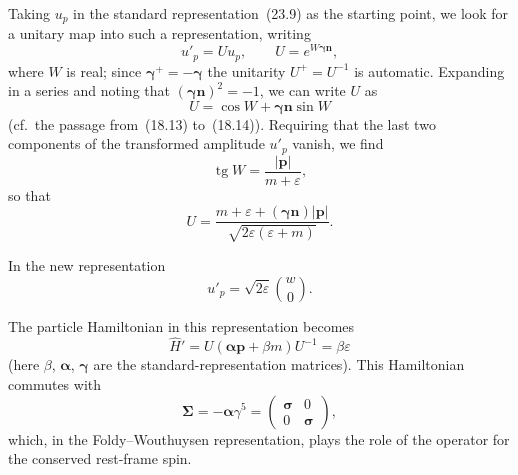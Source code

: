 Taking $u_p$ in the standard representation~(23.9) as the starting point, we look for a unitary map into such a representation, writing
\[
u'_p = Uu_p,\qquad U = e^{W\boldsymbol{\gamma}\mathbf{n}},
\]
where $W$ is real; since $\boldsymbol{\gamma}^+ = -\boldsymbol{\gamma}$ the unitarity $U^+ = U^{-1}$ is automatic. Expanding in a series and noting that $(\boldsymbol{\gamma}\mathbf{n})^2 = -1$, we can write $U$ as
\[
U = \cos W + \boldsymbol{\gamma}\mathbf{n}\sin W
\]
(cf.\ the passage from~(18.13) to~(18.14)). Requiring that the last two components of the transformed amplitude $u'_p$ vanish, we find
\[
\operatorname{tg} W = \frac{|\mathbf{p}|}{m + \varepsilon},
\]
so that
\[
U = \frac{m + \varepsilon + (\boldsymbol{\gamma}\mathbf{n})|\mathbf{p}|}{\sqrt{2\varepsilon(\varepsilon + m)}}.
\]

In the new representation
\begin{equation}
u'_p = \sqrt{2\varepsilon}\binom{w}{0}.
\tag{23.17}
\end{equation}

The particle Hamiltonian in this representation becomes
\begin{equation}
\widehat H' = U(\boldsymbol{\alpha}\mathbf{p} + \beta m)U^{-1} = \beta\varepsilon
\tag{23.18}
\end{equation}
(here $\beta$, $\boldsymbol{\alpha}$, $\boldsymbol{\gamma}$ are the standard-representation matrices). This Hamiltonian commutes with
\[
\boldsymbol{\Sigma} = -\boldsymbol{\alpha}\gamma^5 = \begin{pmatrix} \boldsymbol{\sigma} & 0\\ 0 & \boldsymbol{\sigma} \end{pmatrix},
\]
which, in the Foldy--Wouthuysen representation, plays the role of the operator for the conserved rest-frame spin.
